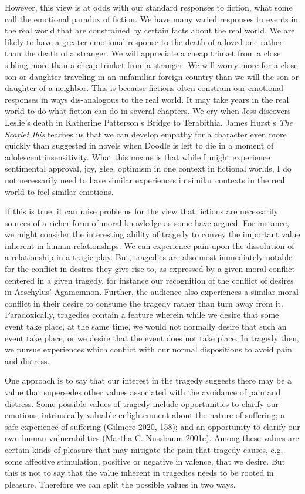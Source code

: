 \documentclass[
  letterpaper,
  DIV=11,
  numbers=noendperiod]{scrartcl}
\theoremstyle{remark}
\begin{document}
However, this view is at odds with our standard responses to fiction,
what some call the emotional paradox of fiction. We have many varied
responses to events in the real world that are constrained by certain
facts about the real world. We are likely to have a greater emotional
response to the death of a loved one rather than the death of a
stranger. We will appreciate a cheap trinket from a close sibling more
than a cheap trinket from a stranger. We will worry more for a close son
or daughter traveling in an unfamiliar foreign country than we will the
son or daughter of a neighbor. This is because fictions often constrain
our emotional responses in ways dis-analogous to the real world. It may
take years in the real world to do what fiction can do in several
chapters. We cry when Jess discovers Leslie's death in Katherine
Patterson's Bridge to Terabithia. James Hurst's \emph{The Scarlet Ibis}
teaches us that we can develop empathy for a character even more quickly
than suggested in novels when Doodle is left to die in a moment of
adolescent insensitivity. What this means is that while I might
experience sentimental approval, joy, glee, optimism in one context in
fictional worlds, I do not necessarily need to have similar experiences
in similar contexts in the real world to feel similar emotions.

If this is true, it can raise problems for the view that fictions are
necessarily sources of a richer form of moral knowledge as some have
argued. For instance, we might consider the interesting ability of
tragedy to convey the important value inherent in human relationships.
We can experience pain upon the dissolution of a relationship in a
tragic play. But, tragedies are also most immediately notable for the
conflict in desires they give rise to, as expressed by a given moral
conflict centered in a given tragedy, for instance our recognition of
the conflict of desires in Aeschylus' Agamemnon. Further, the audience
also experiences a similar moral conflict in their desire to consume the
tragedy rather than turn away from it. Paradoxically, tragedies contain
a feature wherein while we desire that some event take place, at the
same time, we would not normally desire that such an event take place,
or we desire that the event does not take place. In tragedy then, we
pursue experiences which conflict with our normal dispositions to avoid
pain and distress.

One approach is to say that our interest in the tragedy suggests there
may be a value that supersedes other values associated with the
avoidance of pain and distress. Some possible values of tragedy include
opportunities to clarify our emotions, intrinsically valuable
enlightenment about the nature of suffering; a safe experience of
suffering (Gilmore 2020, 158); and an opportunity to clarify our own
human vulnerabilities (Martha C. Nussbaum 2001c). Among these values are
certain kinds of pleasure that may mitigate the pain that tragedy
causes, e.g.\,some affective stimulation, positive or negative in
valence, that we desire. But this is not to say that the value inherent
in tragedies needs to be rooted in pleasure. Therefore we can split the
possible values in two ways.
\end{document}
